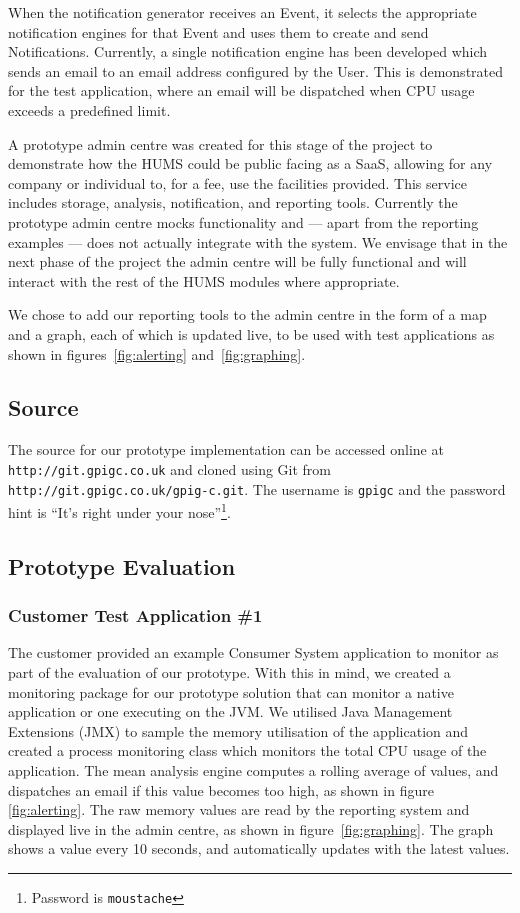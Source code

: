 \documentclass[10pt,a4paper]{article}
\begin{document}
When the notification generator receives an Event, it selects the appropriate 
notification engines for that Event and uses them to create and send  
Notifications. Currently, a single notification engine has been developed which sends an email to an email address configured by the User. This is 
demonstrated for the test application, where an email will be dispatched when CPU usage exceeds a predefined limit.

A prototype admin centre was created for this stage of the project to 
demonstrate how the HUMS could be public facing as a SaaS, allowing for any company or individual to, for a fee, use the facilities provided. This service includes storage, analysis, notification, and reporting tools. Currently the prototype admin centre mocks functionality and --- apart from the reporting examples --- does not actually integrate with the system. We envisage that in the next phase of the project the admin centre will be fully functional and will interact with the rest of the HUMS modules where appropriate.

We chose to add our reporting tools to the admin centre in the form of a map and a graph, each of which is updated live, to be used with test applications as shown in figures~\ref{fig:alerting} and~\ref{fig:graphing}.

\subsection{Source}
\label{sec:source}
The source for our prototype implementation can be accessed online at \texttt{http://git.gpigc.co.uk} and cloned using Git from \texttt{http://git.gpigc.co.uk/gpig-c.git}. The username is \texttt{gpigc} and the password hint is ``It's right under your nose''\footnote{Password is \texttt{moustache}}.

\subsection{Prototype Evaluation}
\label{sec:prototype-evaluation}

\subsubsection{Customer Test Application \#1}
\label{sec:testapp}
The customer provided an example Consumer System application to monitor as part of the
evaluation of our prototype. With this in mind, we created a monitoring 
package for our prototype solution that can monitor a native application
or one executing on the JVM. We utilised Java Management 
Extensions (JMX) to sample the memory utilisation of the application and
created a process monitoring class which monitors the total
CPU usage of the application. The mean analysis engine computes a 
rolling average of values, and dispatches an email if this value
becomes too high, as shown in figure \ref{fig:alerting}. The raw memory
values are read by the reporting system and displayed live in the admin
centre, as shown in figure~\ref{fig:graphing}. The graph shows a value
every 10 seconds, and automatically updates with the latest values.
\end{document}
